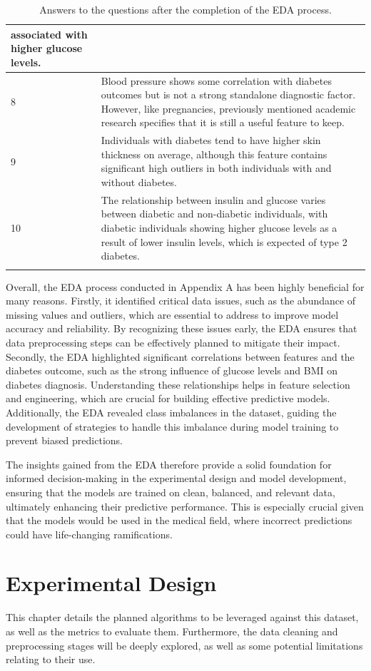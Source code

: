 \documentclass[12pt]{report}
\newcommand{\para}{\vspace{8pt}\noindent}
\begin{document}
\begin{longtable}{ | p{} | p{} | }
    associated with higher glucose levels.\\
    \hline
    8 & Blood pressure shows some correlation with diabetes outcomes but is not a strong standalone diagnostic factor. 
    However, like pregnancies, previously mentioned academic research specifies that it is still a useful feature to keep.\\
    \hline
    9 & Individuals with diabetes tend to have higher skin thickness on average, although this feature contains significant high outliers
    in both individuals with and without diabetes.\\
    \hline
    10 &  The relationship between insulin and glucose varies between diabetic and non-diabetic individuals, with diabetic individuals 
    showing higher glucose levels as a result of lower insulin levels, which is expected of type 2 diabetes.\\
    \hline
    \caption{Answers to the questions after the completion of the EDA process.}\label{tab:Answers}
\end{longtable}

\pagebreak
\para Overall, the EDA process conducted in Appendix A has been highly beneficial for many reasons. Firstly, it identified critical data issues, 
such as the abundance of missing values and outliers, which are essential to address to improve model accuracy and reliability. By recognizing these 
issues early, the EDA ensures that data preprocessing steps can be effectively planned to mitigate their impact. Secondly, the EDA highlighted significant
correlations between features and the diabetes outcome, such as the strong influence of glucose levels and BMI on diabetes diagnosis. Understanding these
relationships helps in feature selection and engineering, which are crucial for building effective predictive models. Additionally, the EDA revealed class 
imbalances in the dataset, guiding the development of strategies to handle this imbalance during model training to prevent biased predictions. 

\para The insights gained from the EDA therefore provide a solid foundation for informed decision-making in the experimental design and model development, 
ensuring that the models are trained on clean, balanced, and relevant data, ultimately enhancing their predictive performance. This is especially crucial 
given that the models would be used in the medical field, where incorrect predictions could have life-changing ramifications.

\chapter{Experimental Design} %
This chapter details the planned algorithms to be leveraged against this dataset,
as well as the metrics to evaluate them. Furthermore, the data cleaning and preprocessing 
stages will be deeply explored, as well as some potential limitations relating to their use.
\end{document}
